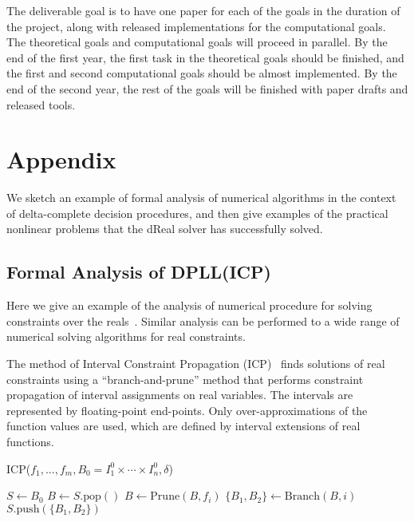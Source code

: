 \documentclass[10pt]{article}
\theoremstyle{definition}
\begin{document}
The deliverable goal is to have one paper for each of the goals in the duration of the project, along with released implementations for the computational goals. The theoretical goals and computational goals will proceed in parallel. By the end of the first year, the first task in the theoretical goals should be finished, and the first and second computational goals should be almost implemented. By the end of the second year, the rest of the goals will be finished with paper drafts and released tools. 





\section*{Appendix}

We sketch an example of formal analysis of numerical algorithms in the context of delta-complete decision procedures, and then give examples of the practical nonlinear problems that the dReal solver has successfully solved. 

\subsection*{Formal Analysis of DPLL(ICP)}
Here we give an example of the analysis of numerical procedure for solving constraints over the reals~\cite{DBLP:conf/cade/GaoAC12}. Similar analysis can be performed to a wide range of numerical solving algorithms for real constraints. 

The method of Interval Constraint Propagation (ICP)~\cite{handbookICP} finds solutions of real constraints using a ``branch-and-prune'' method that performs constraint propagation of interval assignments on real variables. The intervals are represented by floating-point end-points. Only over-approximations of the function values are used, which are defined by interval extensions of real functions.
\begin{algorithm}
\caption{ICP($f_1,...,f_m, B_0 = I_1^0\times\cdots\times I_n^0, \delta$)}\label{icpalgo}
\begin{algorithmic}[1]
\Statex
    \State $S \gets B_0$
        \State $B \gets S.\mathrm{pop}()$
        \State $B \gets \mathrm{Prune}(B, f_i)$
        \EndWhile
                \State $\{B_1,B_2\} \gets \mathrm{Branch}(B, i)$
                \State $S.\mathrm{push}(\{B_1,B_2\})$
            \Else
                \State {}
            \EndIf
        \EndIf
    \EndWhile
    \State {}
\end{algorithmic}\label{algo1}
\end{algorithm}
\end{document}
